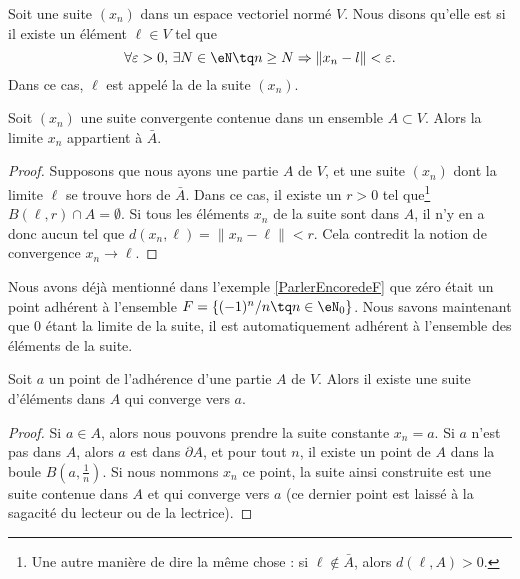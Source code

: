 \begin{definition}		\label{DefCvSuiteEGVN}
	Soit une suite $(x_n)$ dans un espace vectoriel normé $V$. Nous disons qu'elle est  si il existe un élément $\ell\in V$ tel que
	\begin{equation}
		\forall \varepsilon>0,\,\exists N\in\eN\tq n\geq N\Rightarrow \| x_n-l \|<\varepsilon.
	\end{equation}
	Dans ce cas, $\ell$ est appelé la  de la suite $(x_n)$.
\end{definition}




\begin{lemma}		\label{LemLimAbarA}
	Soit $(x_n)$ une suite convergente contenue dans un ensemble $A\subset V$. Alors la limite $x_n$ appartient à $\bar A$.
\end{lemma}

\begin{proof}
	Supposons que nous ayons une partie $A$ de $V$, et une suite $(x_n)$ dont la limite $\ell$ se trouve hors de $\bar A$. Dans ce cas, il existe un $r>0$ tel que\footnote{Une autre manière de dire la même chose : si $\ell\notin\bar A$, alors $d(\ell,A)>0$.} $B(\ell,r)\cap A=\emptyset$. Si tous les éléments $x_n$ de la suite sont dans $A$, il n'y en a donc aucun tel que $d(x_n,\ell)=\| x_n-\ell \|<r$. Cela contredit la notion de convergence $x_n\to \ell$.
\end{proof}

Nous avons déjà mentionné dans l'exemple \ref{ParlerEncoredeF} que zéro était un point adhérent à l'ensemble $F=\{ (-1)^n/n\tq n\in\eN_0 \}$. Nous savons maintenant que $0$ étant la limite de la suite, il est automatiquement adhérent à l'ensemble des éléments de la suite.

\begin{corollary}		\label{CorAdhEstLim}
	Soit $a$ un point de l'adhérence d'une partie $A$ de $V$. Alors il existe une suite d'éléments dans $A$ qui converge vers $a$.
\end{corollary}

\begin{proof}
	Si $a\in A$, alors nous pouvons prendre la suite constante $x_n=a$. Si $a$ n'est pas dans $A$, alors $a$ est dans $\partial A$, et pour tout $n$, il existe un point de $A$ dans la boule $B(a,\frac{1}{ n })$. Si nous nommons $x_n$ ce point, la suite ainsi construite est une suite contenue dans $A$ et qui converge vers $a$ (ce dernier point est laissé à la sagacité du lecteur ou de la lectrice).
\end{proof}

